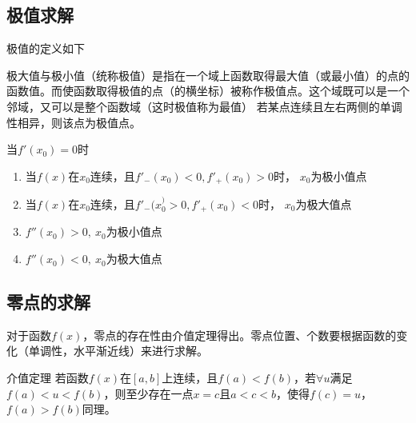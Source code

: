 \subsection{极值求解}
极值的定义如下
\begin{definition}
    极大值与极小值（统称极值）是指在一个域上函数取得最大值（或最小值）的点的函数值。而使函数取得极值的点（的横坐标）被称作极值点。这个域既可以是一个邻域，又可以是整个函数域（这时极值称为最值）
    若某点连续且左右两侧的单调性相异，则该点为极值点。
\end{definition}
\begin{theorem}
    当$f'(x_0)=0$时
    \begin{enumerate}
        \item 当$f(x)$在$x_0$连续，且$f'_-(x_0)<0,f'_+(x_0)>0$时， $x_0$为极小值点
        \item 当$f(x)$在$x_0$连续，且$f'_-(x_0^)>0,f'_+(x_0)<0$时， $x_0$为极大值点
        \item $f''(x_0)>0,\ x_0$为极小值点
        \item $f''(x_0)<0,\ x_0$为极大值点
    \end{enumerate}
\end{theorem}

\subsection{零点的求解}
对于函数$f(x)$，零点的存在性由介值定理得出。零点位置、个数要根据函数的变化（单调性，水平渐近线）来进行求解。
\begin{theorem}
    介值定理
    \label{th:介值定理}
    若函数$f(x)$在$[a,b]$上连续，且$f(a)<f(b)$，若$\forall u$满足$f(a)<u<f(b)$，则至少存在一点$x=c$且$a<c<b$，使得$f(c)=u$，$f(a)>f(b)$同理。
\end{theorem}


